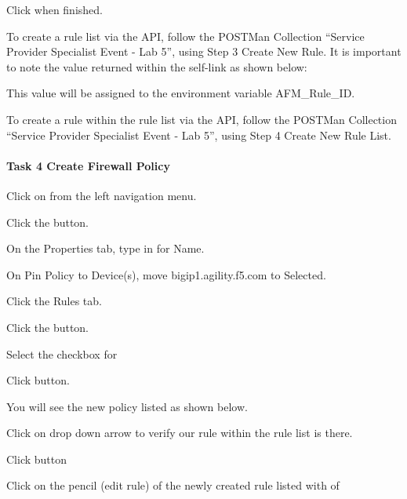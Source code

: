 \documentclass[letterpaper,10pt,english]{sphinxmanual}
\begin{document}

Click  when finished.

To create a rule list via the API, follow the POSTMan Collection
“Service Provider Specialist Event - Lab 5”, using Step 3 \textendash{} Create New
Rule. It is important to note the value returned within the self-link as
shown below:


This value will be assigned to the environment variable AFM\_Rule\_ID.

To create a rule within the rule list via the API, follow the
POSTMan Collection “Service Provider Specialist Event - Lab 5”,
using Step 4 \textendash{} Create New Rule List.


\paragraph{Task 4 \textendash{} Create Firewall Policy}
\label{\detokenize{class1/module5/lab1:task-4-create-firewall-policy}}
Click on  from the left navigation menu.

Click the  button.

On the Properties tab, type in  for Name.

On Pin Policy to Device(s), move bigip1.agility.f5.com to Selected.

Click the Rules tab.

Click the  button.

Select the checkbox for 

Click  button.

You will see the new policy listed as shown below.


Click on drop down arrow to verify our rule within the rule list is
there.


Click  button

Click on the pencil (edit rule) of the newly created rule listed with
 of 
\end{document}
